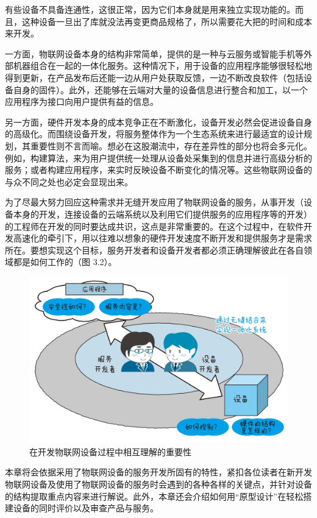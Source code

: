 \documentclass[12pt,UTF8]{ctexbook}
\begin{document}
有些设备不具备连通性，这很正常，因为它们本身就是用来独立实现功能的。而且，这种设备一旦出了库就没法再变更商品规格了，所以需要花大把的时间和成本来开发。

一方面，物联网设备本身的结构非常简单，提供的是一种与云服务或智能手机等外部机器组合在一起的一体化服务。这种情况下，用于设备的应用程序能够很轻松地得到更新，在产品发布后还能一边从用户处获取反馈，一边不断改良软件（包括设备自身的固件）。此外，还能够在云端对大量的设备信息进行整合和加工，以一个应用程序为接口向用户提供有益的信息。

另一方面，硬件开发本身的成本竞争正在不断激化，设备开发必然会促进设备自身的高级化。而围绕设备开发，将服务整体作为一个生态系统来进行最适宜的设计规划，其重要性则不言而喻。想必在这股潮流中，存在差异性的部分也将会多元化。例如，构建算法，来为用户提供统一处理从设备处采集到的信息并进行高级分析的服务；或者构建应用程序，来实时反映设备不断变化的情况等。这些物联网设备的与众不同之处也必定会显现出来。

为了尽最大努力回应这种需求并无缝开发应用了物联网设备的服务，从事开发（设备本身的开发，连接设备的云端系统以及利用它们提供服务的应用程序等的开发）的工程师在开发的同时要达成共识，这点是非常重要的。在这个过程中，在软件开发高速化的牵引下，用以往难以想象的硬件开发速度不断开发和提供服务才是需求所在。要想实现这个目标，服务开发者和设备开发者都必须正确理解彼此在各自领域都是如何工作的（图 3.2）。

\begin{figure}[htbp]
	\centering
	\includegraphics[width=1\linewidth]{53}
	\caption{在开发物联网设备过程中相互理解的重要性}
	\label{fig:1}
\end{figure}

本章将会依据采用了物联网设备的服务开发所固有的特性，紧扣各位读者在新开发物联网设备及使用了物联网设备的服务时会遇到的各种各样的关键点，并针对设备的结构提取重点内容来进行解说。此外，本章还会介绍如何用“原型设计”在轻松搭建设备的同时评价以及审查产品与服务。
\end{document}
